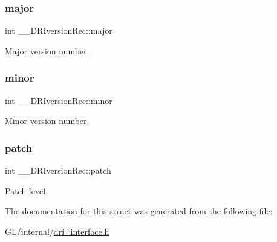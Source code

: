\subsubsection{\texorpdfstring{major}{major}}
{\footnotesize\ttfamily int \+\_\+\+\_\+\+D\+R\+Iversion\+Rec\+::major}

Major version number. \mbox{\label{struct_____d_r_iversion_rec_a315635b82bb1a773097074ef6db3481b}} 
\subsubsection{\texorpdfstring{minor}{minor}}
{\footnotesize\ttfamily int \+\_\+\+\_\+\+D\+R\+Iversion\+Rec\+::minor}

Minor version number. \mbox{\label{struct_____d_r_iversion_rec_af1b4ce3ade39632a6d4e0f1ffbb79323}} 
\subsubsection{\texorpdfstring{patch}{patch}}
{\footnotesize\ttfamily int \+\_\+\+\_\+\+D\+R\+Iversion\+Rec\+::patch}

Patch-\/level. 

The documentation for this struct was generated from the following file\+:\begin{DoxyCompactItemize}
\item 
G\+L/internal/\hyperlink{dri__interface_8h}{dri\+\_\+interface.\+h}\end{DoxyCompactItemize}
